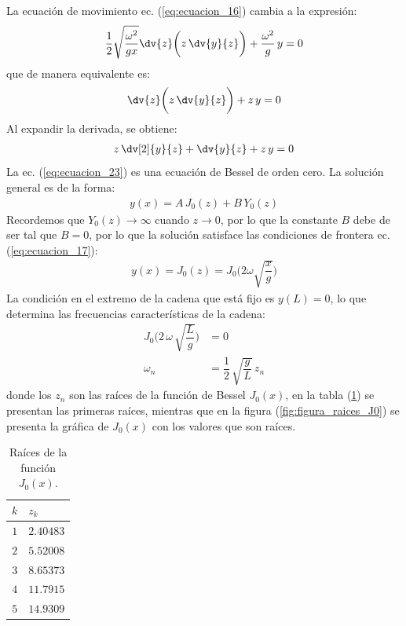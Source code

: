 La ecuación de movimiento ec. (\ref{eq:ecuacion_16}) cambia a la expresión:
\begin{align}
\dfrac{1}{2} \sqrt{\dfrac{\omega^{2}}{g x}} \dv{z} \bigg( z \, \dv{y}{z} \bigg) + \dfrac{\omega^{2}}{g} \, y = 0
\label{eq:ecuacion_21}
\end{align}
que de manera equivalente es:
\begin{align}
\dv{z} \bigg( z \, \dv{y}{z} \bigg) + z \, y = 0
\label{eq:ecuacion_22}
\end{align}
Al expandir la derivada, se obtiene:
\begin{align}
z \, \dv[2]{y}{z} + \dv{y}{z} + z \, y = 0
\label{eq:ecuacion_23}
\end{align}
La ec. (\ref{eq:ecuacion_23}) es una ecuación de Bessel de orden cero. La solución general es de la forma:
\begin{align*}
y (x) = A \, J_{0} (z) + B \, Y_{0} (z)
\end{align*}
Recordemos que $Y_{0} (z) \to \infty$ cuando $z \to 0$, por lo que la constante $B$ debe de ser tal que $B = 0$, por lo que la solución satisface las condiciones de frontera ec. (\ref{eq:ecuacion_17}):
\begin{align}
y (x) = J_{0} (z) = J_{0} \bigg( 2 \omega \sqrt{\dfrac{x}{g}} \bigg)
\label{eq:ecuacion_24}
\end{align}
La condición en el extremo de la cadena que está fijo es $y (L) = 0$, lo que determina las frecuencias características de la cadena:
\begin{align}
J_{0} \bigg( 2 \, \omega \, \sqrt{\dfrac{L}{g}} \bigg) &= 0 \label{eq:ecuacion_25} \\[0.5em]
\omega_{n} &= \dfrac{1}{2} \, \sqrt{\dfrac{g}{L}} \, z_{n} \label{eq:ecuacion_26}
\end{align}
donde los $z_{n}$ son las raíces de la función de Bessel $J_{0} (x)$, en la tabla (\ref{table_Tabla_Ceros_J0}) se presentan las primeras raíces, mientras que en la figura (\ref{fig:figura_raices_J0}) se presenta la gráfica de $J_{0} (x)$ con los valores que son raíces.
\begin{table}[H]
\centering
\large
\begin{tabular}{c | l}
$k$ & $z_{k}$ \\ \hline
$1$ & $2.40483$ \\
$2$ & $5.52008$ \\
$3$ & $8.65373$ \\
$4$ & $11.7915$ \\
$5$ & $14.9309$ \\
\end{tabular}
\caption{Raíces de la función $J_{0} (x)$.}
\label{table_Tabla_Ceros_J0}
\end{table}
